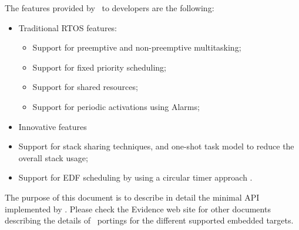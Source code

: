 The features provided by \ee\ to developers are the following:
\begin{itemize}
\item Traditional RTOS features:
  \begin{itemize}
  \item Support for preemptive and non-preemptive multitasking;
  \item Support for fixed priority scheduling;
  \item Support for shared resources;
  \item Support for periodic activations using Alarms;
  \end{itemize}
\item Innovative features
  \item Support for stack sharing techniques, and one-shot task
    model to reduce the overall stack usage;
  \item Support for EDF scheduling by using a circular timer approach
    \cite{Carlini03}.
\end{itemize}

The purpose of this document is to describe in detail the minimal API
implemented by \ee. Please check the Evidence web site for other
documents describing the details of \ee\ portings for the different
supported embedded targets.
